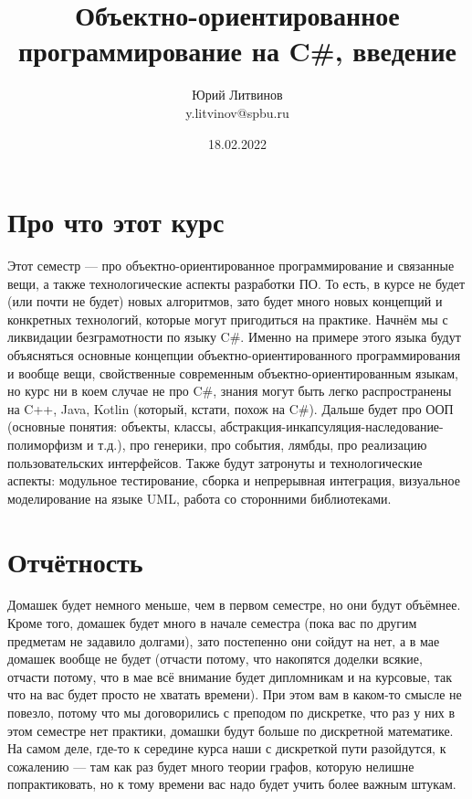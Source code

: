 \documentclass[a5paper]{article}
\title{Объектно-ориентированное программирование на C\#, введение}
\author{Юрий Литвинов\\\small{y.litvinov@spbu.ru}}
\date{18.02.2022}
\begin{document}
\maketitle
\thispagestyle{empty}

\section{Про что этот курс}

Этот семестр --- про объектно-ориентированное программирование и связанные вещи, а также технологические аспекты разработки ПО. То есть, в курсе не будет (или почти не будет) новых алгоритмов, зато будет много новых концепций и конкретных технологий, которые могут пригодиться на практике. Начнём мы с ликвидации безграмотности по языку C\#. Именно на примере этого языка будут объясняться основные концепции объектно-ориентированного программирования и вообще вещи, свойственные современным объектно-ориентированным языкам, но курс ни в коем случае не про C\#, знания могут быть легко распространены на C++, Java, Kotlin (который, кстати, похож на C\#). Дальше будет про ООП (основные понятия: объекты, классы, абстракция-инкапсуляция-наследование-полиморфизм и т.д.), про генерики, про события, лямбды, про реализацию пользовательских интерфейсов. Также будут затронуты и технологические аспекты: модульное тестирование, сборка и непрерывная интеграция, визуальное моделирование на языке UML, работа со сторонними библиотеками.

\section{Отчётность}

Домашек будет немного меньше, чем в первом семестре, но они будут объёмнее. Кроме того, домашек будет много в начале семестра (пока вас по другим предметам не задавило долгами), зато постепенно они сойдут на нет, а в мае домашек вообще не будет (отчасти потому, что накопятся доделки всякие, отчасти потому, что в мае всё внимание будет дипломникам и на курсовые, так что на вас будет просто не хватать времени). При этом вам в каком-то смысле не повезло, потому что мы договорились с преподом по дискретке, что раз у них в этом семестре нет практики, домашки будут больше по дискретной математике. На самом деле, где-то к середине курса наши с дискреткой пути разойдутся, к сожалению --- там как раз будет много теории графов, которую нелишне попрактиковать, но к тому времени вас надо будет учить более важным штукам.
\end{document}
